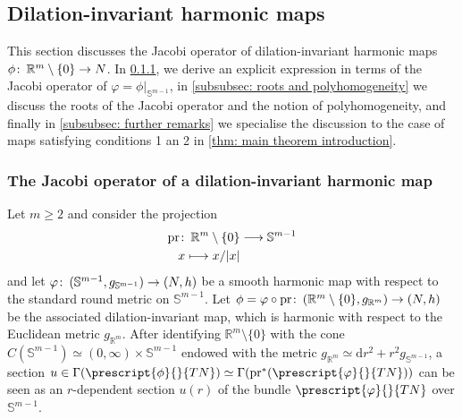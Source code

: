 \documentclass{article}
\numberwithin{equation}{section}        %
\theoremstyle{bfnote}
\theoremstyle{definition}
\theoremstyle{bfremark}
\newcommand{\col}{\colon \thinspace}        %
\newcommand{\R}{\mathbb{R}}                 %
\newcommand{\Sp}{\mathbb{S}}                %
\newcommand{\pr}{\mathrm{pr}}               %
\newcommand{\diff}{\mathrm{d}}                      %
\begin{document}
    \subsection{Dilation-invariant harmonic maps}       \label{subsec: Dilation-invariant harmonic maps} 

This section discusses the Jacobi operator of dilation-invariant harmonic maps $\phi \col \R^m \setminus \{0 \} \to N$. In \cref{subsubsec: the jacobi operator of dilation-invariant maps}, we derive an explicit expression in terms of the Jacobi operator of $\varphi = \left. \phi \right|_{\Sp^{m-1}}$, in \cref{subsubsec: roots and polyhomogeneity} we discuss the roots of the Jacobi operator and the notion of polyhomogeneity, and finally in \cref{subsubsec: further remarks} we specialise the discussion to the case of maps satisfying conditions 1 an 2 in \cref{thm: main theorem introduction}.

    \subsubsection{The Jacobi operator of a dilation-invariant harmonic map}    \label{subsubsec: the jacobi operator of dilation-invariant maps}

Let $m \geq 2$ and consider the projection 
\begin{align*}
    \pr \col \R^m \setminus \{0\} & \longrightarrow \mathbb{S}^{m-1} \\ x \longmapsto x/|x|
\end{align*}
and let $\varphi \col (\Sp^{m-1},g_{\mathrm{\Sp^{m-1}}}) \rightarrow (N,h)$ be a smooth harmonic map with respect to the standard round metric on $\Sp^{m-1}$. Let $\phi = \varphi \circ \pr \col (\R^m \setminus \{0\}, g_{\R^m}) \to (N,h)$ be the associated dilation-invariant map, which is harmonic with respect to the Euclidean metric $g_{\R^m}$.  After identifying $\R^m \setminus \{0\}$ with the cone $C(\Sp^{m-1}) \simeq (0,\infty) \times \Sp^{m-1}$ endowed with the metric $g_{\R^m} \simeq \diff r^2 + r^2 g_{\Sp^{m-1}}$, a section $u \in \Gamma(\prescript{\phi}{}{TN}) \simeq  \Gamma(\pr^* (\prescript{\varphi}{}{TN}))$ can be seen as an $r$-dependent section $u(r)$ of the bundle $\prescript{\varphi}{}{TN}$ over $\Sp^{m-1}$. 
\end{document}
